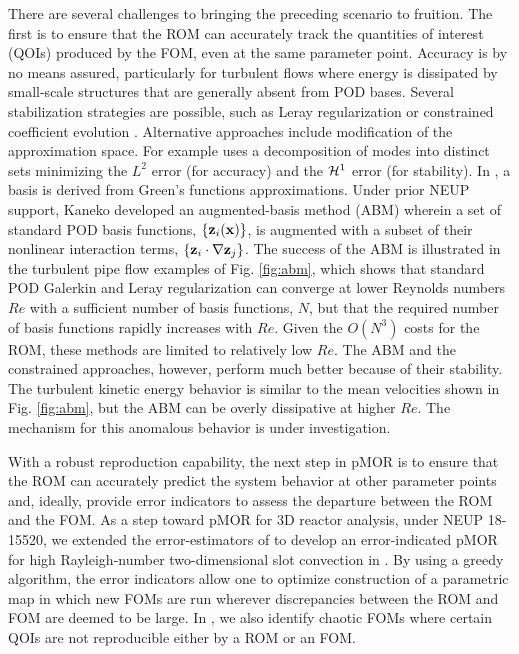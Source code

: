 There are several challenges to bringing the preceding scenario to fruition.
The first is to ensure that the ROM can accurately track the quantities
of interest (QOIs) produced by the FOM, even at the same parameter point.
Accuracy is by no means assured, particularly for turbulent flows
where energy is dissipated by small-scale structures that are generally absent
from POD bases.  Several stabilization strategies are possible, such as Leray
regularization \cite{wang2012proper} or constrained coefficient evolution
\cite{fick18}.  Alternative approaches include modification of the approximation
space.  For example \cite{akkari19} uses a decomposition of modes
into distinct sets minimizing the $L^2$ error (for accuracy) and the ${\cal H}^1$
error (for stability).  In \cite{khodkar2019}, a basis is derived from Green's
functions approximations.
   Under prior NEUP support, Kaneko \cite{kaneko22a,kaneko22} developed an
augmented-basis method (ABM) wherein a set of standard POD basis functions,
$\{{\bf z}_i({\bf x}) \}$,  is augmented with a subset of their nonlinear interaction
terms, $\{{\bf z}_i \cdot \nabla {\bf z}_j\}$.
  The success of the ABM is illustrated in the turbulent pipe flow
examples of Fig. \ref{fig:abm}, which shows that standard POD Galerkin and
Leray regularization can converge at lower Reynolds numbers $Re$ with a
sufficient number of basis functions, $N$, but that the required number of
basis functions rapidly increases with $Re$.  Given the $O(N^3)$ costs for the
ROM, these methods are limited to relatively low $Re$.  The ABM and
the constrained approaches, however, perform much better because of their
stability.  The turbulent kinetic energy behavior is similar to the
mean velocities shown in Fig. \ref{fig:abm}, but the ABM
can be overly dissipative at higher $Re$.  The mechanism for this anomalous
behavior is under investigation.

With a robust reproduction capability, the next step in pMOR is to ensure that
the ROM can accurately predict the system behavior at other parameter points
and, ideally, provide error indicators to assess the departure between the ROM
and the FOM.  As a step toward pMOR for 3D reactor analysis, under NEUP
18-15520,  we extended the error-estimators of \cite{fick18} to develop
an error-indicated pMOR for high Rayleigh-number two-dimensional slot
convection in \cite{tsai22a}.
By using a greedy algorithm, the error indicators allow one to optimize
construction of a parametric map in which new FOMs are run wherever
discrepancies between the ROM and FOM are deemed to be large.
In \cite{tsai22a}, we also identify chaotic FOMs where certain QOIs are not
reproducible either by a ROM or an FOM.



